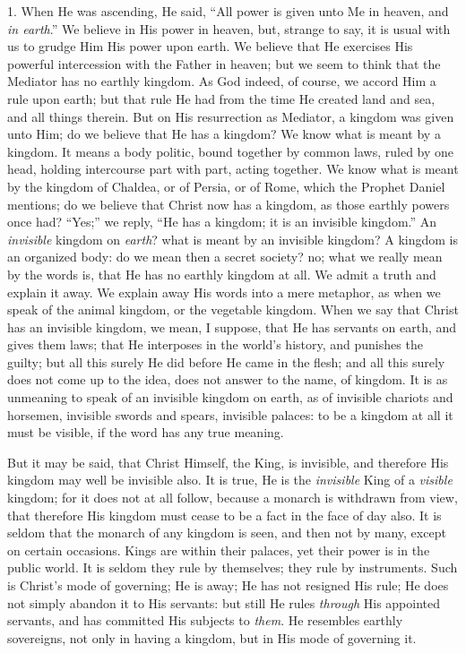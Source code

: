 1. When He was ascending, He said, ``All power is given unto Me
in heaven, and \emph{in earth}.'' We believe in His power in
heaven, but, strange to say, it is usual with us to grudge Him His
power upon earth. We believe that He exercises His powerful
intercession with the Father in heaven; but we seem to think that the
Mediator has no earthly kingdom. As God indeed, of course, we accord
Him a rule upon earth; but that rule He had from the time He created
land and sea, and all things therein. But on His resurrection as
Mediator, a kingdom was given unto Him; do we believe that He has a
kingdom? We know what is meant by a kingdom. It means a body politic,
bound together by common laws, ruled by one head, holding intercourse
part with part, acting together. We know what is meant by the kingdom
of Chaldea, or of Persia, or of Rome, which the Prophet Daniel
mentions; do we believe that Christ now has a kingdom, as those
earthly powers once had? ``Yes;'' we reply, ``He has a
kingdom; it is an invisible kingdom.'' An \emph{invisible} kingdom
on \emph{earth}? what is meant by an invisible kingdom? A kingdom is
an organized body: do we mean then a secret society? no; what we
really mean by the words is, that He has no earthly kingdom at all. We
admit a truth and explain it away. We explain away His words into a
mere metaphor, as when we speak of the animal kingdom, or the
vegetable kingdom. When we say that Christ has an invisible kingdom,
we mean, I suppose, that He has servants on earth, and gives them
laws; that He interposes in the world's history, and punishes the
guilty; but all this surely He did before He came in the flesh; and
all this surely does not come up to the idea, does not answer to the
name, of kingdom. It is as unmeaning to speak of an invisible kingdom
on earth, as of invisible chariots and horsemen, invisible swords and
spears, invisible palaces: to be a kingdom at all it must be visible,
if the word has any true meaning.

But it may be said, that Christ Himself, the King, is invisible,
and therefore His kingdom may well be invisible also. It is true, He
is the \emph{invisible} King of a \emph{visible} kingdom; for it does
not at all follow, because a monarch is withdrawn from view, that
therefore His kingdom must cease to be a fact in the face of day also.
It is seldom that the monarch of any kingdom is seen, and then not by
many, except on certain occasions. Kings are within their palaces, yet
their power is in the public world. It is seldom they rule by
themselves; they rule by instruments. Such is Christ's mode of
governing; He is away; He has not resigned His rule; He does not
simply abandon it to His servants: but still He rules \emph{through}
His appointed servants, and has committed His subjects to \emph{them}.
He resembles earthly sovereigns, not only in having a kingdom, but in
His mode of governing it.

